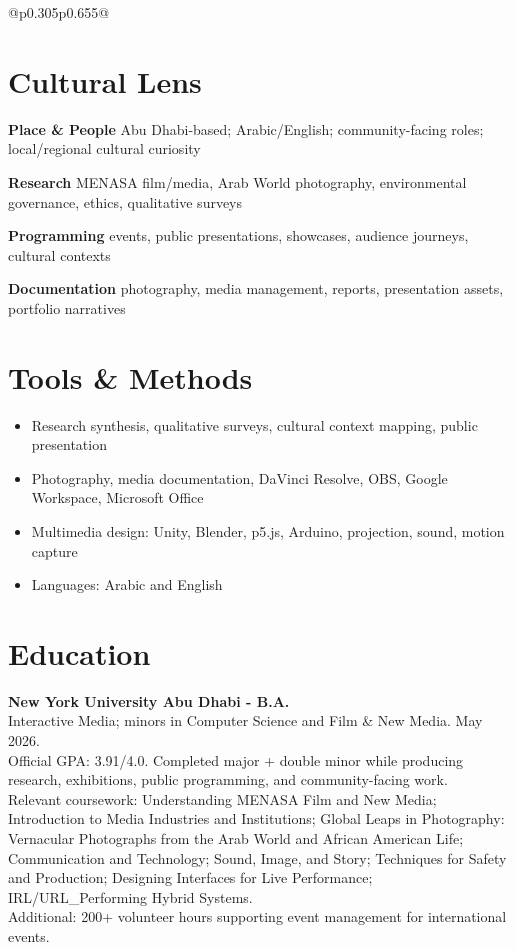 \documentclass[letterpaper,10pt]{article}
\newcommand{\leftcoltext}{\fontsize{8.5}{10.2}\selectfont\color{text}}
\begin{document}
  {\setlength{\tabcolsep}{7pt}
  \begin{tabular}{@{}p{0.305\textwidth}p{0.655\textwidth}@{}}

  \begin{minipage}[t]{\linewidth}
  \leftcoltext
  \section{Cultural Lens}
  \textbf{\color{accent}Place \& People} Abu Dhabi-based; Arabic/English; community-facing roles; local/regional cultural curiosity

  \vspace{3pt}
  \textbf{\color{accent}Research} MENASA film/media, Arab World photography, environmental governance, ethics, qualitative surveys

  \vspace{3pt}
  \textbf{\color{accent}Programming} events, public presentations, showcases, audience journeys, cultural contexts

  \vspace{3pt}
  \textbf{\color{accent}Documentation} photography, media management, reports, presentation assets, portfolio narratives

  \section{Tools \& Methods}
  \begin{itemize}
    \item Research synthesis, qualitative surveys, cultural context mapping, public presentation
    \item Photography, media documentation, DaVinci Resolve, OBS, Google Workspace, Microsoft Office
    \item Multimedia design: Unity, Blender, p5.js, Arduino, projection, sound, motion capture
    \item Languages: Arabic and English
  \end{itemize}

  \section{Education}
  \textbf{New York University Abu Dhabi - B.A.}\\
  Interactive Media; minors in Computer Science and Film \& New Media. May 2026.\\[2pt]
  Official GPA: 3.91/4.0. Completed major + double minor while producing research, exhibitions, public programming, and community-facing work.\\[2pt]
Relevant coursework: Understanding MENASA Film and New Media; Introduction to Media Industries and Institutions; Global Leaps in Photography: Vernacular Photographs from the Arab World and African American Life; Communication and Technology; Sound, Image, and Story; Techniques for Safety and Production; Designing Interfaces for Live Performance; IRL/URL\_Performing Hybrid Systems.\\[2pt]
  Additional: 200+ volunteer hours supporting event management for international events.


\end{minipage}
\end{tabular}}
\end{document}

